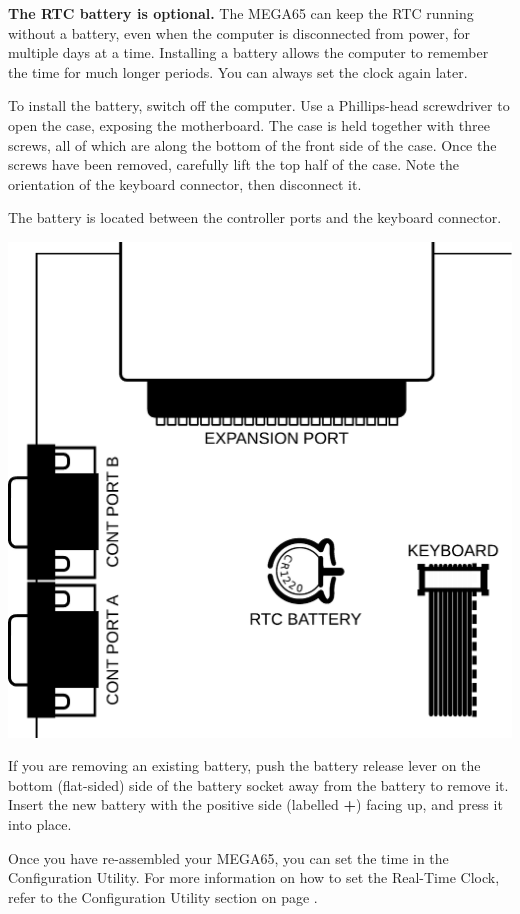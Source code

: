 {\bf The RTC battery is optional.} The MEGA65 can keep the RTC running without a battery, even when the computer is disconnected from power, for multiple days at a time. Installing a battery allows the computer to remember the time for much longer periods. You can always set the clock again later.

To install the battery, switch off the computer. Use a Phillips-head screwdriver to open the case, exposing the motherboard. The case is held together with three screws, all of which are along the bottom of the front side of the case. Once the screws have been removed, carefully lift the top half of the case. Note the orientation of the keyboard connector, then disconnect it.

The battery is located between the controller ports and the keyboard connector.

\includegraphics[width=\linewidth]{images/illustrations/rtc-battery-location.pdf}

If you are removing an existing battery, push the battery release lever on the bottom (flat-sided) side of the battery socket away from the battery to remove it. Insert the new battery with the positive side (labelled {\bf +}) facing up, and press it into place.

Once you have re-assembled your MEGA65, you can set the time in the Configuration Utility. For more information on how to set the Real-Time Clock, refer to the Configuration Utility section on page \pageref{sec:configuration-utility}.


